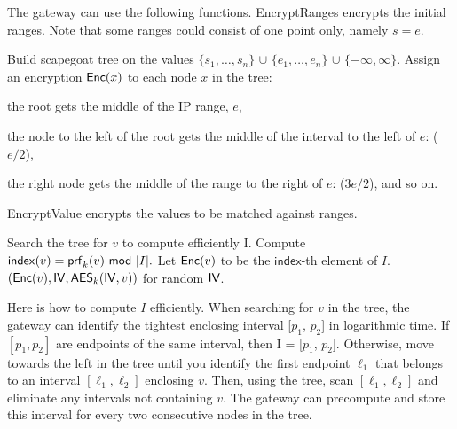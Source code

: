 The gateway can use the following functions. EncryptRanges encrypts the initial ranges. Note that some ranges could consist of
one point only, namely $s = e$. 


\begin{framed}
\begin{algorithmic}[1]

  \State Build scapegoat tree on the values 
              $\{s_1, \dots, s_n\}$ 
              $\cup$ $\{e_1, \dots, e_n\}$ 
              $\cup$ $\{-\infty, \infty\}$.
  \State Assign an encryption $\mathsf{Enc}(x)$ to each node $x$ in the tree:
  \begin{CompactItemize}
  \item the root gets the middle of the IP range, $e$, 
  \item the node to the left of the root gets the middle of the interval to the left of $e$: ($e/2$),
  \item the right node gets the middle of the range
  to the right of $e$: ($3e/2$), and so on.
  \end{CompactItemize}

  \State {}
\EndProcedure

\end{algorithmic}
\end{framed}



EncryptValue encrypts the values to be matched against ranges.

\begin{framed}
\begin{algorithmic}[1]

  \State Search the tree for $v$ to compute efficiently I.
  \State Compute $\mathsf{index}(v) = \mathsf{prf}_k(v)\ \mathsf{mod}\ |I|.$ 
  \State Let $\mathsf{Enc}(v)$ to be the $\mathsf{index}$-th element of $I$. 
  \State \Return $\left(\mathsf{Enc}(v), \mathsf{IV}, \mathsf{AES}_k(\mathsf{IV}, v)\right)$ for random $\mathsf{IV}$. 
\EndProcedure

\end{algorithmic}
\end{framed}

Here is how to compute $I$ efficiently. When searching for $v$ in the tree, the gateway
can identify the tightest enclosing interval [$p_1$, $p_2$] in logarithmic time. 
 If $[p_1, p_2]$ are endpoints of the
same interval, then I = [$p_1$, $p_2$]. Otherwise, move towards the left in the tree until you identify the first endpoint
$\ell_1$
that belongs to an interval $[\ell_1, \ell_2]$ enclosing $v$. Then, using the tree, scan $[\ell_1, \ell_2]$ and eliminate
any intervals not containing $v$. The gateway can precompute and store this interval for every two consecutive nodes in the tree.

